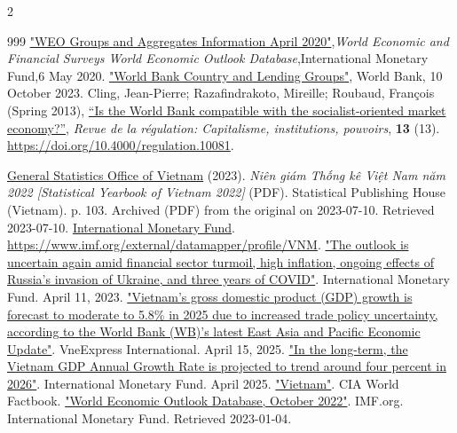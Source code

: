 \documentclass[openany]{book}
\begin{document}
\begin{multicols}{2}
\begin{thebibliography}{999}
 \href{https://www.imf.org/external/pubs/ft/weo/2020/01/weodata/groups.htm}{"WEO Groups and Aggregates Information April 2020"},\emph{World Economic and Financial Surveys World Economic Outlook Database},International Monetary Fund,6 May 2020.
 \href{https://datahelpdesk.worldbank.org/knowledgebase/articles/906519-world-bank-country-and-lending-groups}{"World Bank Country and Lending Groups"}, World Bank, 10 October 2023.
 Cling, Jean-Pierre; Razafindrakoto, Mireille; Roubaud, François (Spring 2013), \href{https://doi.org/10.4000%2Fregulation.10081}{``Is the World Bank compatible with the socialist-oriented market economy?''}, \textit{Revue de la régulation: Capitalisme, institutions, pouvoirs}, \textbf{13} (13). \url{https://doi.org/10.4000/regulation.10081}.\par
{} \href{https://en.wikipedia.org/wiki/General_Statistics_Office_of_Vietnam}{General Statistics Office of Vietnam} (2023). \textit{Niên giám Thống kê Việt Nam năm 2022 [Statistical Yearbook of Vietnam 2022]} (PDF). Statistical Publishing House (Vietnam). p. 103. Archived (PDF) from the original on 2023-07-10. Retrieved 2023-07-10.
 \href{https://en.wikipedia.org/wiki/International_Monetary_Fund}{International Monetary Fund}. \url{https://www.imf.org/external/datamapper/profile/VNM}.
 \href{https://www.imf.org/en/Publications/WEO/Issues/2023/04/11/world-economic-outlook-april-2023}{"The outlook is uncertain again amid financial sector turmoil, high inflation, ongoing effects of Russia's invasion of Ukraine, and three years of COVID"}. International Monetary Fund. April 11, 2023.
 \href{https://e.vnexpress.net/news/business/economy/world-bank-forecasts-vietnam-gdp-growth-at-5-8-in-2025-4878731.html}{"Vietnam's gross domestic product (GDP) growth is forecast to moderate to 5.8\% in 2025 due to increased trade policy uncertainty, according to the World Bank (WB)'s latest East Asia and Pacific Economic Update"}. VneExpress International. April 15, 2025.
 \href{https://www.imf.org/external/datamapper/profile/VNM}{"In the long-term, the Vietnam GDP Annual Growth Rate is projected to trend around four percent in 2026"}. International Monetary Fund. April 2025.
 \href{https://www.cia.gov/the-world-factbook/countries/vietnam/}{"Vietnam"}. CIA World Factbook.
 \href{https://www.imf.org/en/Publications/WEO/weo-database/2022/October/weo-report?c=582,&s=NGDP_R,NGDP_RPCH,NGDP,NGDPD,PPPGDP,NGDP_D,NGDPRPC,NGDPRPPPPC,NGDPPC,NGDPDPC,PPPPC,PPPSH,PPPEX,NID_NGDP,NGSD_NGDP,PCPI,PCPIPCH,PCPIE,PCPIEPCH,TM_RPCH,TMG_RPCH,TX_RPCH,TXG_RPCH,LUR,LP,GGR,GGR_NGDP,GGX,GGX_NGDP,GGXCNL,GGXCNL_NGDP,GGSB,GGXONLB,GGXONLB_NGDP,GGXWDG,GGXWDG_NGDP,NGDP_FY,BCA,BCA_NGDPD,&sy=2023&ey=2023&ssm=0&scsm=1&scc=0&ssd=1&ssc=0&sic=0&sort=country&ds=.&br=1}{"World Economic Outlook Database, October 2022"}. IMF.org. International Monetary Fund. Retrieved 2023-01-04.

\end{thebibliography}
\end{multicols}
\end{document}
